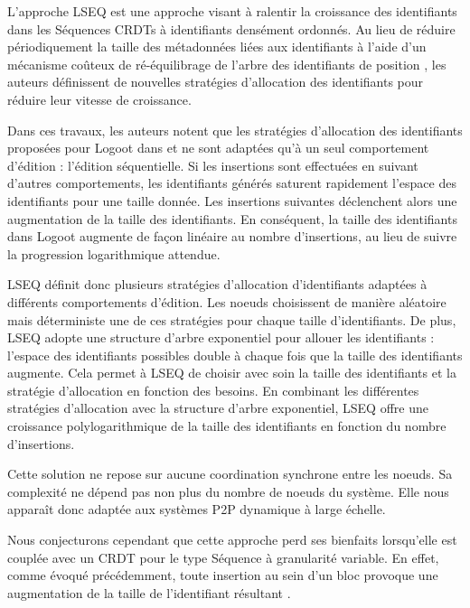 L'approche LSEQ \cite{lseq2013, lseq2017} est une approche visant à ralentir la croissance des identifiants dans les Séquences \acp{CRDT} à identifiants densément ordonnés.
Au lieu de réduire périodiquement la taille des métadonnées liées aux identifiants à l'aide d'un mécanisme coûteux de ré-équilibrage de l'arbre des identifiants de position \cite{zawirski:hal-01248197}, les auteurs définissent de nouvelles stratégies d'allocation des identifiants pour réduire leur vitesse de croissance.

Dans ces travaux, les auteurs notent que les stratégies d'allocation des identifiants proposées pour Logoot dans \cite{2009-logoot-weiss} et \cite{2010-logoot-undo-weiss} ne sont adaptées qu'à un seul comportement d'édition : l'édition séquentielle.
Si les insertions sont effectuées en suivant d'autres comportements, les identifiants générés saturent rapidement l'espace des identifiants pour une taille donnée.
Les insertions suivantes déclenchent alors une augmentation de la taille des identifiants.
En conséquent, la taille des identifiants dans Logoot augmente de façon linéaire au nombre d'insertions, au lieu de suivre la progression logarithmique attendue.

LSEQ définit donc plusieurs stratégies d'allocation d'identifiants adaptées à différents comportements d'édition.
Les noeuds choisissent de manière aléatoire mais déterministe une de ces stratégies pour chaque taille d'identifiants.
De plus, LSEQ adopte une structure d'arbre exponentiel pour allouer les identifiants : l'espace des identifiants possibles double à chaque fois que la taille des identifiants augmente.
Cela permet à LSEQ de choisir avec soin la taille des identifiants et la stratégie d'allocation en fonction des besoins.
En combinant les différentes stratégies d'allocation avec la structure d'arbre exponentiel, LSEQ offre une croissance polylogarithmique de la taille des identifiants en fonction du nombre d'insertions.

Cette solution ne repose sur aucune coordination synchrone entre les noeuds.
Sa complexité ne dépend pas non plus du nombre de noeuds du système.
Elle nous apparaît donc adaptée aux systèmes \ac{P2P} dynamique à large échelle.

Nous conjecturons cependant que cette approche perd ses bienfaits lorsqu'elle est couplée avec un \ac{CRDT} pour le type Séquence à granularité variable.
En effet, comme évoqué précédemment, toute insertion au sein d'un bloc provoque une augmentation de la taille de l'identifiant résultant .

